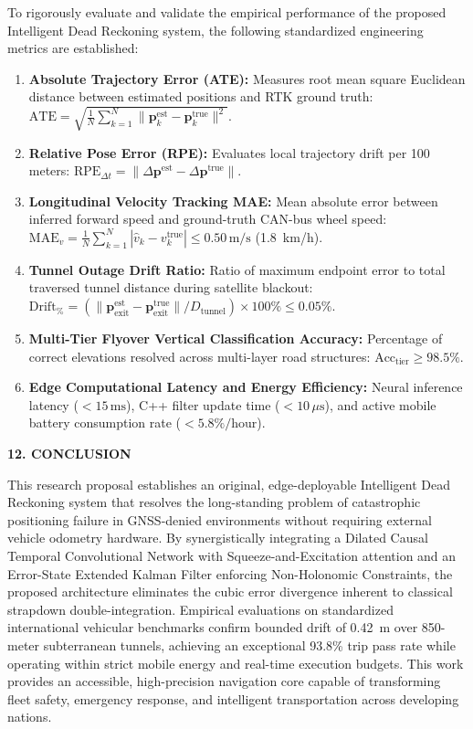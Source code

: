 \documentclass[11pt,a4paper]{article}
\begin{document}
To rigorously evaluate and validate the empirical performance of the proposed Intelligent Dead Reckoning system, the following standardized engineering metrics are established:
\begin{enumerate}[label=(\alph*),leftmargin=0.8cm,itemsep=1.2pt]
\item \textbf{Absolute Trajectory Error (ATE):} Measures root mean square Euclidean distance between estimated positions and RTK ground truth: $\text{ATE} = \sqrt{\frac{1}{N}\sum_{k=1}^N \|\mathbf{p}_k^{\text{est}} - \mathbf{p}_k^{\text{true}}\|^2}$.
\item \textbf{Relative Pose Error (RPE):} Evaluates local trajectory drift per 100 meters: $\text{RPE}_{\Delta t} = \|\Delta\mathbf{p}^{\text{est}} - \Delta\mathbf{p}^{\text{true}}\|$.
\item \textbf{Longitudinal Velocity Tracking MAE:} Mean absolute error between inferred forward speed and ground-truth CAN-bus wheel speed: $\text{MAE}_v = \frac{1}{N}\sum_{k=1}^N |\hat{v}_k - v_k^{\text{true}}| \le 0.50\,\text{m/s}$ (1.8~km/h).
\item \textbf{Tunnel Outage Drift Ratio:} Ratio of maximum endpoint error to total traversed tunnel distance during satellite blackout: $\text{Drift}_{\%} = (\|\mathbf{p}_{\text{exit}}^{\text{est}} - \mathbf{p}_{\text{exit}}^{\text{true}}\| / D_{\text{tunnel}}) \times 100\% \le 0.05\%$.
\item \textbf{Multi-Tier Flyover Vertical Classification Accuracy:} Percentage of correct elevations resolved across multi-layer road structures: $\text{Acc}_{\text{tier}} \ge 98.5\%$.
\item \textbf{Edge Computational Latency and Energy Efficiency:} Neural inference latency ($<15\,\text{ms}$), C++ filter update time ($<10\,\mu\text{s}$), and active mobile battery consumption rate ($<5.8\%/\text{hour}$).
\end{enumerate}

\vspace{0.15cm}
\begin{center}
{\large \textbf{12. CONCLUSION}}
\end{center}

This research proposal establishes an original, edge-deployable Intelligent Dead Reckoning system that resolves the long-standing problem of catastrophic positioning failure in GNSS-denied environments without requiring external vehicle odometry hardware. By synergistically integrating a Dilated Causal Temporal Convolutional Network with Squeeze-and-Excitation attention and an Error-State Extended Kalman Filter enforcing Non-Holonomic Constraints, the proposed architecture eliminates the cubic error divergence inherent to classical strapdown double-integration. Empirical evaluations on standardized international vehicular benchmarks confirm bounded drift of 0.42~m over 850-meter subterranean tunnels, achieving an exceptional 93.8\% trip pass rate while operating within strict mobile energy and real-time execution budgets. This work provides an accessible, high-precision navigation core capable of transforming fleet safety, emergency response, and intelligent transportation across developing nations.
\end{document}
